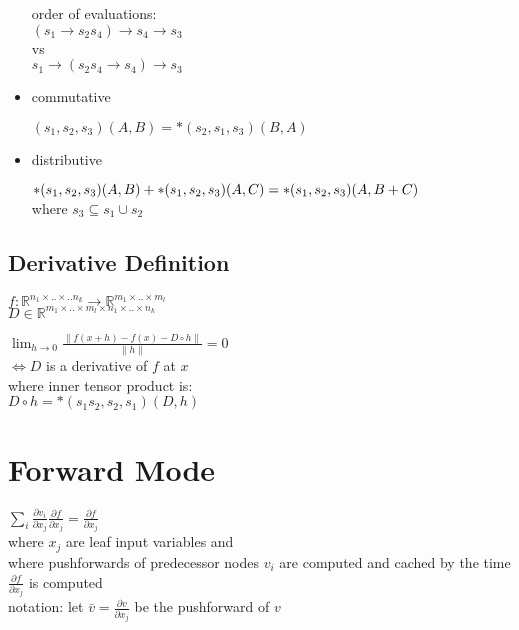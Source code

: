 \documentclass[8pt,letter]{article}
\newcommand{\R}{\mathbb{R}}
\begin{document}
\begin{multicols*}{2}
\begin{itemize}
    order of evaluations:\\
    $(s_1 \rightarrow s_2 s_4) \rightarrow s_4 \rightarrow s_3$\\
    vs\\
    $s_1 \rightarrow (s_2 s_4 \rightarrow s_4) \rightarrow s_3$
     
    \item commutative

      $(s_1,s_2,s_3)(A,B) = *(s_2,s_1,s_3)(B,A)$
    
    \item distributive

      $*(s_1,s_2,s_3)(A,B) + *(s_1,s_2,s_3)(A,C)\\= *(s_1,s_2,s_3)(A, B+C)$\\
      where $s_3 \subseteq s_1 \cup s_2$

  \end{itemize}

  \subsection{Derivative Definition}

  $f: \R^{n_1 \times .. \times .. n_k} \rightarrow \R^{m_1 \times .. \times m_l}$\\
  $D \in \R^{m_1 \times .. \times m_l \times n_1 \times .. \times n_k}$

  $\lim_{h \rightarrow 0} \frac{\| f(x+h) - f(x) - D \circ h\|}{\| h \|} = 0$\\
  $\iff D$ is a derivative of $f$ at $x$\\
  
  where inner tensor product is: \\
  $D \circ h = *(s_1 s_2, s_2, s_1)(D,h)$

  \vfill\null
  \columnbreak
    
  \section{Forward Mode}
  $\sum_{i} \frac{ \partial v_i}{\partial x_j} \frac{\partial f}{\partial x_j} = \frac{\partial f}{\partial x_j}$\\
  where $x_j$ are leaf input variables and\\
  where pushforwards of predecessor nodes $v_i$ are computed and cached by the time $\frac{\partial f}{\partial x_j}$ is computed\\
  
  notation: let $\bar{v} = \frac{\partial v}{\partial x_j}$ be the pushforward of $v$


\end{multicols*}
\end{document}
